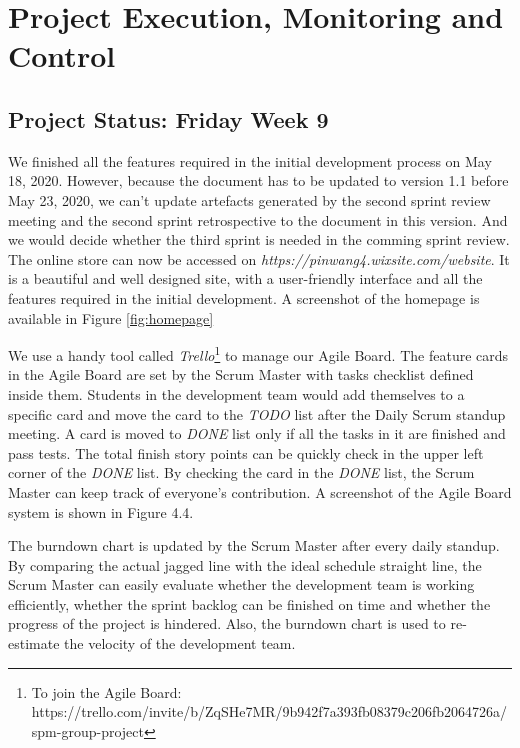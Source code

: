 \chapter{Project Execution, Monitoring and Control}
\label{chap:pe}
\section{Project Status: Friday Week 9}
\label{sec:ps1}
We finished all the features required in the initial development process on May 18, 2020. However, because the document has to be updated to version 1.1 before May 23, 2020, we can’t update artefacts generated by the second sprint review meeting and the second sprint retrospective to the document in this version. And we would decide whether the third sprint is needed in the comming sprint review. The online store can now be accessed on \textit{https://pinwang4.wixsite.com/website}. It is a beautiful and well designed site, with a user-friendly interface and all the features required in the initial development. A screenshot of the homepage is available in Figure \ref{fig:homepage}

We use a handy tool called \textit{Trello}\footnote{To join the Agile Board: https://trello.com/invite/b/ZqSHe7MR/9b942f7a393fb08379c206fb2064726a/spm-group-project} to manage our Agile Board. The feature cards in the Agile Board are set by the Scrum Master with tasks checklist defined inside them. Students in the development team would add themselves to a specific card and move the card to the \textit{TODO} list after the Daily Scrum standup meeting. A card is moved to \textit{DONE} list only if all the tasks in it are finished and pass tests. The total finish story points can be quickly check in the upper left corner of the \textit{DONE} list. By checking the card in the \textit{DONE} list, the Scrum Master can keep track of everyone’s contribution. A screenshot of the Agile Board system is shown in Figure 4.4.

The burndown chart is updated by the Scrum Master after every daily standup. By comparing the actual jagged line with the ideal schedule straight line, the Scrum Master can easily evaluate whether the development team is working efficiently, whether the sprint backlog can be finished on time and whether the progress of the project is hindered. Also, the burndown chart is used to re-estimate the velocity of the development team. 

